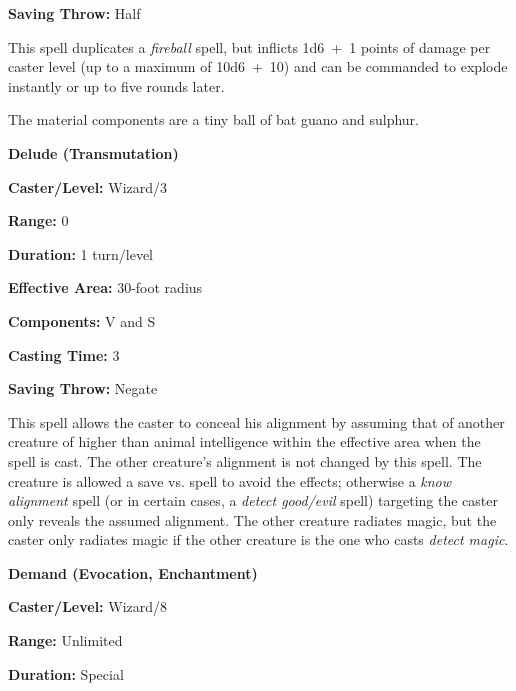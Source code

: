 \begin{multicols}{2}
\begin{minipage}{\columnwidth}
\noindent \textbf{Saving Throw:} Half

\end{minipage}

This spell duplicates a \textit{fireball} spell, but inflicts 1d6~+~1 points of damage per caster level (up to a maximum of 10d6~+~10) and can be commanded to explode instantly or up to five rounds later. 

The material components are a tiny ball of bat guano and sulphur.

\vspace{1em}

\noindent
\begin{minipage}{\columnwidth}

\noindent \textbf{Delude (Transmutation)}

\noindent \textbf{Caster/Level:} Wizard/3

\noindent \textbf{Range:} 0

\noindent \textbf{Duration:} 1 turn/level

\noindent \textbf{Effective Area:} 30-foot radius

\noindent \textbf{Components:} V and S

\noindent \textbf{Casting Time:} 3

\noindent \textbf{Saving Throw:} Negate

\end{minipage}

This spell allows the caster to conceal his alignment by assuming that of another creature of higher than animal intelligence within the effective area when the spell is cast.  The other creature's alignment is not changed by this spell.  The creature is allowed a save vs. spell to avoid the effects; otherwise a \textit{know alignment} spell (or in certain cases, a \textit{detect good/evil} spell) targeting the caster only reveals the assumed alignment.  The other creature radiates magic, but the caster only radiates magic if the other creature is the one who casts \textit{detect magic}.  

\vspace{1em}

\noindent
\begin{minipage}{\columnwidth}

\noindent \textbf{Demand (Evocation, Enchantment)}

\noindent \textbf{Caster/Level:} Wizard/8

\noindent \textbf{Range:} Unlimited

\noindent \textbf{Duration:} Special


\end{minipage}
\end{multicols}

